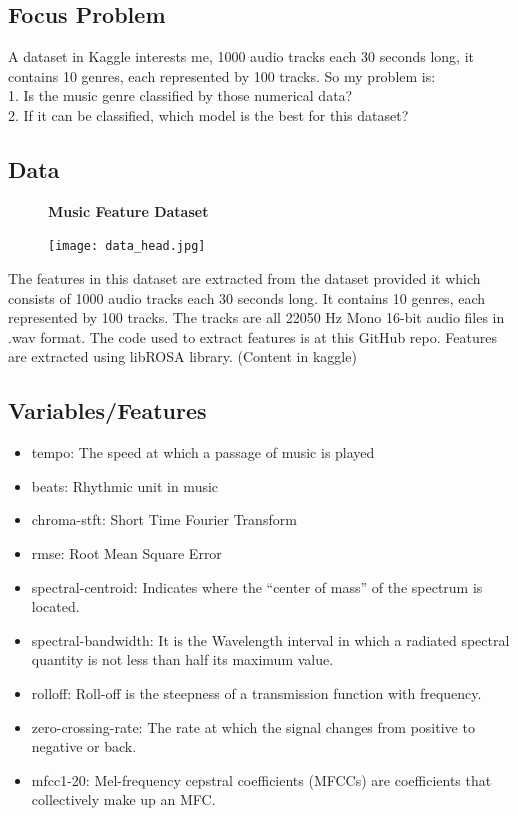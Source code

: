 \documentclass[12pt,a4paper]{article}
\begin{document}
\subsection{Focus Problem}
A dataset in Kaggle interests me, 1000 audio tracks each 30 seconds long, it contains 10 genres, each represented by 100 tracks. So my problem is:\\
1. Is the music genre classified by those numerical data?\\
2. If it can be classified, which model is the best for this dataset?

\subsection{Data}
\begin{figure}[h]
    \centering
    \textbf{Music Feature Dataset}\par\medskip
    \texttt{[image: data\_head.jpg]}
\end{figure}

The features in this dataset are extracted from the dataset provided it which consists of 1000 audio tracks each 30 seconds long. It contains 10 genres, each represented by 100 tracks. The tracks are all 22050 Hz Mono 16-bit audio files in .wav format. The code used to extract features is at this GitHub repo. Features are extracted using libROSA library. (Content in kaggle)

\subsection{Variables/Features}
\begin{itemize}
  \item tempo: The speed at which a passage of music is played
  \item beats: Rhythmic unit in music
  \item chroma-stft: Short Time Fourier Transform
  \item rmse: Root Mean Square Error
  \item spectral-centroid: Indicates where the “center of mass” of the spectrum is located.
  \item spectral-bandwidth: It is the Wavelength interval in which a radiated spectral quantity is not less than half its maximum value.
  \item rolloff: Roll-off is the steepness of a transmission function with frequency.
  \item zero-crossing-rate: The rate at which the signal changes from positive to negative or back.
  \item mfcc1-20: Mel-frequency cepstral coefficients (MFCCs) are coefficients that collectively make up an MFC.
\end{itemize}
\end{document}
